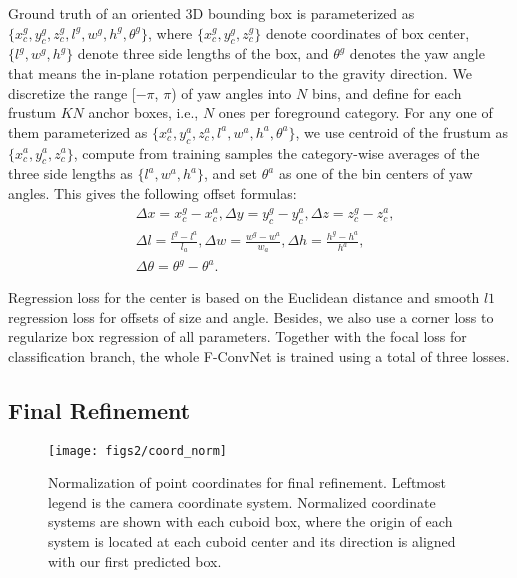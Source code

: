 \documentclass[letterpaper, 10 pt, conference]{ieeeconf}
\begin{document}
Ground truth of an oriented 3D bounding box is parameterized as $\{x_c^g, y_c^g, z_c^g, l^g, w^g, h^g, \theta^g\}$, where $\{x_c^g, y_c^g, z_c^g\}$ denote coordinates of box center,  $\{l^g, w^g, h^g\}$ denote three side lengths of the box, and $\theta^g$ denotes the yaw angle that means the in-plane rotation perpendicular to the gravity direction. We discretize the range [$-\pi$, $\pi$) of yaw angles into $N$ bins, and define for each frustum $KN$ anchor boxes, i.e., $N$ ones per foreground category. For any one of them parameterized as $\{x_c^a, y_c^a, z_c^a, l^a, w^a, h^a, \theta^a\}$, we use centroid of the frustum as $\{x_c^a, y_c^a, z_c^a\}$, compute from training samples the category-wise averages of the three side lengths as $\{l^a, w^a, h^a\}$, and set $\theta^a$ as one of the bin centers of yaw angles. This gives the following offset formulas:
\begin{equation}
	\begin{split}
		& \Delta x = x_c^g - x_c^a, \Delta y = y_c^g - y_c^a, \Delta z = z_c^g - z_c^a, \\
		& \Delta l = \frac{l^g - l^a}{l_a}, \Delta w = \frac{w^g - w^a}{w_a}, \Delta h = \frac{h^g - h^a}{h^a}, \\
		& \Delta \theta = \theta^g - \theta^a .
	\end{split}
\end{equation}

Regression loss for the center is based on the Euclidean distance and smooth $l1$ regression loss for offsets of size and angle. Besides, we also use a corner loss \cite{qi2018frustum} to regularize box regression of all parameters. Together with the focal loss for classification branch, the whole F-ConvNet is trained using a total of three losses.

\subsection{Final Refinement}

\begin{figure}
	\begin{center}
	\texttt{[image: figs2/coord\_norm]}
	\caption[]{Normalization of point coordinates for final refinement. Leftmost legend is the camera coordinate system. Normalized coordinate systems are shown with each cuboid box, where the origin of each system is located at each cuboid center and its direction is aligned with our first predicted box. }
	\label{Fig:coordnorm}
	\end{center}
	\vspace{-0.5cm}
\end{figure}
\end{document}
